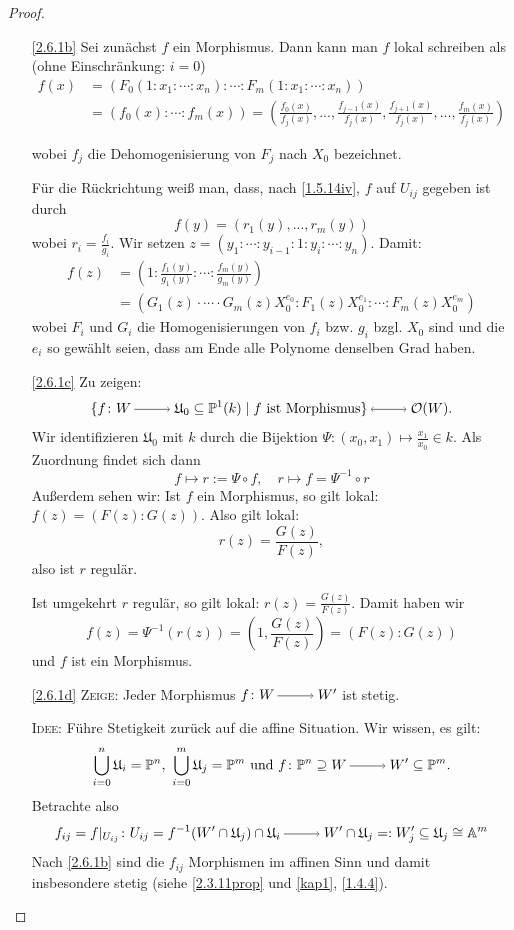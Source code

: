 \documentclass[a4paper,12pt,index=toc]{scrbook}
\theoremstyle{keinenummern} %
\def\A{\mathbb{A}}
\def\O{\mathcal{O}}
\def\P{\mathbb{P}}
\def\U{\mathfrak{U}}
\newcommand{\restrict}[1]{|_{#1}}
\renewcommand{\dotsc}{\ensuremath{\!...}}
\begin{document}
\begin{proof}
  \begin{enumerate}
  \item[\ref{2.6.1b}] Sei zunächst $f$ ein Morphismus. Dann kann man $f$ lokal schreiben als (ohne Einschränkung: $i=0$)
\begin{align*}f(x)&=(F_0(1:x_1:\dotsm:x_n):\dotsm:F_m(1:x_1:\dotsm:x_n))\\
&=(f_0(x):\dotsm :f_m(x))=\left(\frac {f_0(x)}{f_j(x)},\dotsc,\frac{f_{j-1}(x)}{f_j(x)},\frac{f_{j+1}(x)}{f_j(x)},\dotsc,\frac {f_m(x)}{f_j(x)}\right)\end{align*}

wobei $f_j$ die Dehomogenisierung von $F_j$ nach $X_0$ bezeichnet.

Für die Rückrichtung weiß man, dass, nach \cref{1.5.14iv}, $f$ auf $U_{ij}$ gegeben ist durch 
\[f(y)=(r_1(y),\dotsc,r_m(y))\]
wobei $r_i=\frac{f_i}{g_i}$. Wir setzen $z=(y_1:\dotsm:y_{i-1}:1:y_i:\dotsm :y_n)$. Damit:
\begin{align*} f(z)&=\left(1:\frac{f_1(y)}{g_1(y)}:\dotsm :\frac{f_m(y)}{g_m(y)}\right)\\&=(G_1(z)\cdot\dotsm\cdot G_m(z)X_0^{e_0}:F_1(z)X_0^{e_1}: \dotsm :F_m(z)X_0^{e_m})\end{align*}
wobei $F_i$ und $G_i$ die Homogenisierungen von $f_i$ bzw. $g_i$ bzgl. $X_0$ sind und die $e_i$ so gewählt seien, dass am Ende alle Polynome denselben Grad haben.  
  \item[\ref{2.6.1c}] Zu zeigen:
\[\{f\colon W\ra \U_0\subseteq \P^1(k) \mid f \text{ ist Morphismus}\} \lra \O(W).\]
Wir identifizieren $\U_0$ mit $k$ durch die Bijektion $\Psi \colon (x_0,x_1)\mapsto \frac{x_1}{x_0} \in k$. Als Zuordnung findet sich dann
\[f\mapsto r:=\Psi \circ f, \quad r\mapsto f=\Psi^{-1}\circ r\]
Außerdem sehen wir: Ist $f$ ein Morphismus, so gilt lokal: $f(z)=(F(z):G(z))$. Also gilt lokal: \[r(z)=\frac{G(z)}{F(z)},\] also ist $r$ regulär.

Ist umgekehrt $r$ regulär, so gilt lokal: $r(z)=\frac{G(z)}{F(z)}$. Damit haben wir 
\[f(z)=\Psi^{-1}(r(z))=(1,\frac{G(z)}{F(z)})=(F(z):G(z))\]
und $f$ ist ein Morphismus.

  \item[\ref{2.6.1d}] {\scshape Zeige:} Jeder Morphismus $f\colon W\ra W'$ ist stetig.

 {\scshape Idee:} Führe Stetigkeit zurück auf die affine Situation.
Wir wissen, es gilt:
\[\bigcup_{i=0}^{n}\U_i=\P^n,\ \bigcup_{i=0}^{m}\U_j=\P^m\text{ und } f\colon \P^n \supseteq W\ra W'\subseteq \P^m.\]
Betrachte also
\[ f_{ij}=f\restrict{U_{ij}} \colon U_{ij}=f^{-1}(W'\cap \U_j)\cap\U_{i}\ra W'\cap \U_j=:W_j'\subseteq \U_j\cong \A^m\]
Nach \ref{2.6.1b} sind die $f_{ij}$ Morphismen im affinen Sinn und damit insbesondere stetig (siehe \cref{2.3.11prop} und \cref{kap1}, \cref{1.4.4}).


\end{enumerate}
\end{proof}
\end{document}
